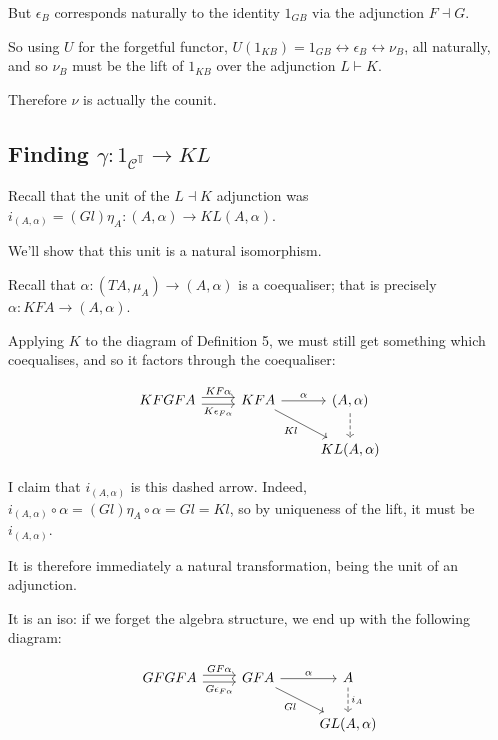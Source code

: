 \documentclass[11pt]{amsart}
\begin{document}
But $\epsilon_B$ corresponds naturally to the identity $1_{GB}$ via the adjunction $F \dashv G$.

So using $U$ for the forgetful functor, $U(1_{KB}) = 1_{GB} \leftrightarrow \epsilon_B \leftrightarrow \nu_B$, all naturally, and so $\nu_B$ must be the lift of $1_{KB}$ over the adjunction $L \vdash K$.

Therefore $\nu$ is actually the counit.

\subsection{Finding \texorpdfstring{$\gamma: 1_{\mathcal{C}^{\mathbb{T}}} \to KL$}{gamma}}

Recall that the unit of the $L \dashv K$ adjunction was $i_{(A, \alpha)} = (Gl) \eta_A : (A, \alpha) \to KL(A, \alpha)$.

We'll show that this unit is a natural isomorphism.

Recall that $\alpha: (TA, \mu_A) \to (A, \alpha)$ is a coequaliser; that is precisely $\alpha: KFA \to (A, \alpha)$.

Applying $K$ to the diagram of Definition 5, we must still get something which coequalises, and so it factors through the coequaliser:

\[
\begin{tikzcd}
KFGFA
    \arrow[r, shift left, "KF \alpha"]
    \arrow[r, shift right, "K \epsilon_{F \alpha}"']
& KFA
    \arrow[r, "\alpha"]
    \arrow[dr, "K l"']
& (A, \alpha)
    \arrow[d, dashrightarrow]
\\
& & KL(A, \alpha)
\end{tikzcd}
\]

I claim that $i_{(A, \alpha)}$ is this dashed arrow.
Indeed, $i_{({A, \alpha})} \circ \alpha = (Gl) \eta_A \circ \alpha = Gl = Kl$, so by uniqueness of the lift, it must be $i_{(A, \alpha)}$.

It is therefore immediately a natural transformation, being the unit of an adjunction.

It is an iso: if we forget the algebra structure, we end up with the following diagram:

\[
\begin{tikzcd}
GFGFA
    \arrow[r, shift left, "GF \alpha"]
    \arrow[r, shift right, "G \epsilon_{F \alpha}"']
& GFA
    \arrow[r, "\alpha"]
    \arrow[dr, "G l"']
& A
    \arrow[d, dashrightarrow, "i_A"]
\\
& & GL(A, \alpha)
\end{tikzcd}
\]
\end{document}
